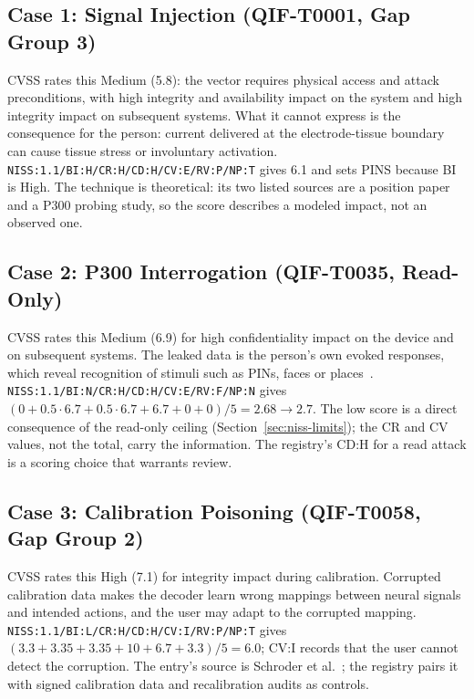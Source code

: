 \subsection{Case 1: Signal Injection (QIF-T0001, Gap Group 3)}

CVSS rates this Medium (5.8): the vector requires physical access and attack preconditions,
with high integrity and availability impact on the system and high integrity impact on
subsequent systems. What it cannot express is the consequence for the person: current
delivered at the electrode-tissue boundary can cause tissue stress or involuntary activation.
\texttt{NISS:1.1/BI:H/CR:H/CD:H/CV:E/RV:P/NP:T} gives 6.1 and sets PINS because BI is High.
The technique is theoretical: its two listed sources are a position paper and a P300 probing
study, so the score describes a modeled impact, not an observed one.

\subsection{Case 2: P300 Interrogation (QIF-T0035, Read-Only)}

CVSS rates this Medium (6.9) for high confidentiality impact on the device and on subsequent
systems. The leaked data is the person's own evoked responses, which reveal recognition of
stimuli such as PINs, faces or places~\cite{martinovic2012feasibility}.
\texttt{NISS:1.1/BI:N/CR:H/CD:H/CV:E/RV:F/NP:N} gives
$(0 + 0.5 \cdot 6.7 + 0.5 \cdot 6.7 + 6.7 + 0 + 0)/5 = 2.68 \to 2.7$. The low score is
a direct consequence of the read-only ceiling (Section~\ref{sec:niss-limits}); the CR and CV
values, not the total, carry the information. The registry's CD:H for a read attack is a
scoring choice that warrants review.

\subsection{Case 3: Calibration Poisoning (QIF-T0058, Gap Group 2)}

CVSS rates this High (7.1) for integrity impact during calibration. Corrupted calibration
data makes the decoder learn wrong mappings between neural signals and intended actions,
and the user may adapt to the corrupted mapping. \texttt{NISS:1.1/BI:L/CR:H/CD:H/CV:I/RV:P/NP:T}
gives $(3.3 + 3.35 + 3.35 + 10 + 6.7 + 3.3)/5 = 6.0$; CV:I records that the user cannot
detect the corruption. The entry's source is Schroder et al.~\cite{schroder2025cyberrisks}; the
registry pairs it with signed calibration data and recalibration audits as controls.

